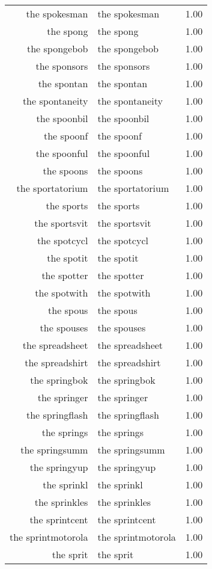 \begin{table}[ht]
\begin{tabular}{rlr}
  the spokesman & the spokesman & 1.00 \\ 
  the spong & the spong & 1.00 \\ 
  the spongebob & the spongebob & 1.00 \\ 
  the sponsors & the sponsors & 1.00 \\ 
  the spontan & the spontan & 1.00 \\ 
  the spontaneity & the spontaneity & 1.00 \\ 
  the spoonbil & the spoonbil & 1.00 \\ 
  the spoonf & the spoonf & 1.00 \\ 
  the spoonful & the spoonful & 1.00 \\ 
  the spoons & the spoons & 1.00 \\ 
  the sportatorium & the sportatorium & 1.00 \\ 
  the sports & the sports & 1.00 \\ 
  the sportsvit & the sportsvit & 1.00 \\ 
  the spotcycl & the spotcycl & 1.00 \\ 
  the spotit & the spotit & 1.00 \\ 
  the spotter & the spotter & 1.00 \\ 
  the spotwith & the spotwith & 1.00 \\ 
  the spous & the spous & 1.00 \\ 
  the spouses & the spouses & 1.00 \\ 
  the spreadsheet & the spreadsheet & 1.00 \\ 
  the spreadshirt & the spreadshirt & 1.00 \\ 
  the springbok & the springbok & 1.00 \\ 
  the springer & the springer & 1.00 \\ 
  the springflash & the springflash & 1.00 \\ 
  the springs & the springs & 1.00 \\ 
  the springsumm & the springsumm & 1.00 \\ 
  the springyup & the springyup & 1.00 \\ 
  the sprinkl & the sprinkl & 1.00 \\ 
  the sprinkles & the sprinkles & 1.00 \\ 
  the sprintcent & the sprintcent & 1.00 \\ 
  the sprintmotorola & the sprintmotorola & 1.00 \\ 
  the sprit & the sprit & 1.00 \\ 

\end{tabular}
\end{table}
